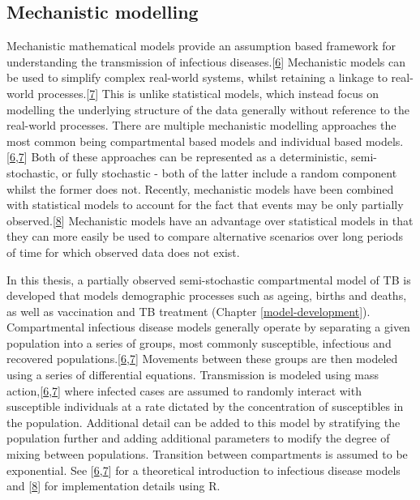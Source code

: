 \documentclass[11pt,twoside]{bristolthesis}
\begin{document}
  \hypertarget{mechanistic-modelling}{%
  \subsection{Mechanistic modelling}\label{mechanistic-modelling}}
  
  Mechanistic mathematical models provide an assumption based framework for understanding the transmission of infectious diseases.{[}\protect\hyperlink{ref-Anderson1991}{6}{]} Mechanistic models can be used to simplify complex real-world systems, whilst retaining a linkage to real-world processes.{[}\protect\hyperlink{ref-Keeling2007}{7}{]} This is unlike statistical models, which instead focus on modelling the underlying structure of the data generally without reference to the real-world processes. There are multiple mechanistic modelling approaches the most common being compartmental based models and individual based models.{[}\protect\hyperlink{ref-Anderson1991}{6},\protect\hyperlink{ref-Keeling2007}{7}{]} Both of these approaches can be represented as a deterministic, semi-stochastic, or fully stochastic - both of the latter include a random component whilst the former does not. Recently, mechanistic models have been combined with statistical models to account for the fact that events may be only partially observed.{[}\protect\hyperlink{ref-King}{8}{]} Mechanistic models have an advantage over statistical models in that they can more easily be used to compare alternative scenarios over long periods of time for which observed data does not exist.
  
  In this thesis, a partially observed semi-stochastic compartmental model of TB is developed that models demographic processes such as ageing, births and deaths, as well as vaccination and TB treatment (Chapter \ref{model-development}). Compartmental infectious disease models generally operate by separating a given population into a series of groups, most commonly susceptible, infectious and recovered populations.{[}\protect\hyperlink{ref-Anderson1991}{6},\protect\hyperlink{ref-Keeling2007}{7}{]} Movements between these groups are then modeled using a series of differential equations. Transmission is modeled using mass action,{[}\protect\hyperlink{ref-Anderson1991}{6},\protect\hyperlink{ref-Keeling2007}{7}{]} where infected cases are assumed to randomly interact with susceptible individuals at a rate dictated by the concentration of susceptibles in the population. Additional detail can be added to this model by stratifying the population further and adding additional parameters to modify the degree of mixing between populations. Transition between compartments is assumed to be exponential. See {[}\protect\hyperlink{ref-Anderson1991}{6},\protect\hyperlink{ref-Keeling2007}{7}{]} for a theoretical introduction to infectious disease models and {[}\protect\hyperlink{ref-King}{8}{]} for implementation details using R.
  
\end{document}
